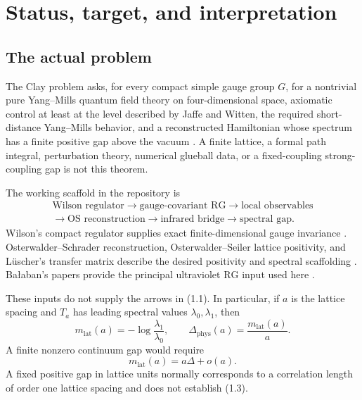 \documentclass[11pt]{article}
\theoremstyle{definition}
\newcommand{\YM}{Yang--Mills}
\newcommand{\RG}{\mathrm{RG}}
\begin{document}
\tableofcontents

\section{Status, target, and interpretation}

\subsection{The actual problem}

The Clay problem asks, for every compact simple gauge group \(G\), for a
nontrivial pure \YM{} quantum field theory on four-dimensional space,
axiomatic control at least at the level described by Jaffe and Witten, the
required short-distance \YM{} behavior, and a reconstructed Hamiltonian
whose spectrum has a finite positive gap above the vacuum
\cite{jaffewitten}.  A finite lattice, a formal path integral, perturbation
theory, numerical glueball data, or a fixed-coupling strong-coupling gap is
not this theorem.

The working scaffold in the repository is
\[
\begin{gathered}
\text{Wilson regulator}
\longrightarrow
\text{gauge-covariant \(\RG\)}
\longrightarrow
\text{local observables}
\\[-0.2em]
\longrightarrow
\text{OS reconstruction}
\longrightarrow
\text{infrared bridge}
\longrightarrow
\text{spectral gap}.
\end{gathered}
\tag{1.1}
\]
Wilson's compact regulator supplies exact finite-dimensional gauge
invariance \cite{wilson1974}.  Osterwalder--Schrader reconstruction,
Osterwalder--Seiler lattice positivity, and L\"uscher's transfer matrix
describe the desired positivity and spectral scaffolding
\cite{os1973,os1975,osterwalderseiler,luscher}.  Ba{\l}aban's papers provide
the principal ultraviolet \(\RG\) input used here
\cite{balaban1984propagatorsII,balaban1985averaging,
balaban1985gaugefixing,balaban1985backgroundpropagators,
balaban1985variational,balaban1987rgi,balaban1988rgii}.

These inputs do not supply the arrows in (1.1).  In particular, if \(a\) is
the lattice spacing and \(T_a\) has leading spectral values
\(\lambda_0,\lambda_1\), then
\[
m_{\mathrm{lat}}(a)=-\log\frac{\lambda_1}{\lambda_0},
\qquad
\Delta_{\mathrm{phys}}(a)=\frac{m_{\mathrm{lat}}(a)}{a}.
\tag{1.2}
\]
A finite nonzero continuum gap would require
\[
m_{\mathrm{lat}}(a)=a\Delta+o(a).
\tag{1.3}
\]
A fixed positive gap in lattice units normally corresponds to a correlation
length of order one lattice spacing and does not establish (1.3).
\end{document}
